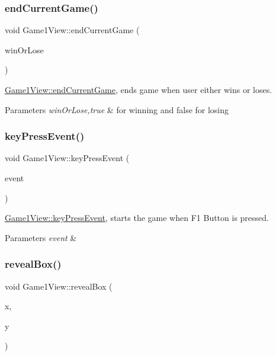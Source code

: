 \subsubsection{\texorpdfstring{end\+Current\+Game()}{endCurrentGame()}}
{\footnotesize\ttfamily void Game1\+View\+::end\+Current\+Game (\begin{DoxyParamCaption}\item[{bool}]{win\+Or\+Lose }\end{DoxyParamCaption})}



\hyperlink{classGame1View_ad1c25c3de31c9b0181af7e837284b0d5}{Game1\+View\+::end\+Current\+Game}, ends game when user either wins or loses. 


\begin{DoxyParams}{Parameters}
{\em win\+Or\+Lose,true} & for winning and false for losing \\
\hline
\end{DoxyParams}
\mbox{\label{classGame1View_a013dc48c98ecb2c52516d433aac4a112}} 
\subsubsection{\texorpdfstring{key\+Press\+Event()}{keyPressEvent()}}
{\footnotesize\ttfamily void Game1\+View\+::key\+Press\+Event (\begin{DoxyParamCaption}\item[{Q\+Key\+Event $\ast$}]{event }\end{DoxyParamCaption})}



\hyperlink{classGame1View_a013dc48c98ecb2c52516d433aac4a112}{Game1\+View\+::key\+Press\+Event}, starts the game when F1 Button is pressed. 


\begin{DoxyParams}{Parameters}
{\em event} & \\
\hline
\end{DoxyParams}
\mbox{\label{classGame1View_aa5ed1a0bd0034b87c20c649c3950a337}} 
\subsubsection{\texorpdfstring{reveal\+Box()}{revealBox()}}
{\footnotesize\ttfamily void Game1\+View\+::reveal\+Box (\begin{DoxyParamCaption}\item[{int}]{x,  }\item[{int}]{y }\end{DoxyParamCaption})}



